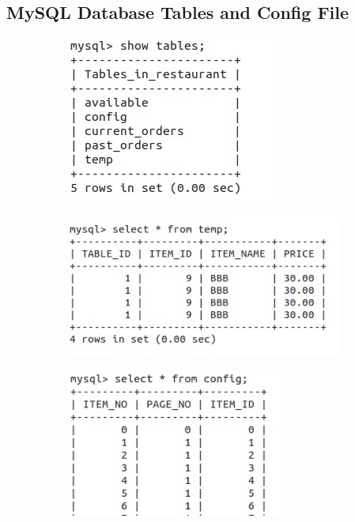 \documentclass[12pt,a4paper]{article}
\begin{document}
\subsection{MySQL Database Tables and Config File}
\begin{figure}[h]
	\centering
	\begin{subfigure}{.5\textwidth}
		\centering
		\includegraphics[width=.8\textwidth]{all_tables}
	\end{subfigure}%
	\begin{subfigure}{.5\textwidth}
		\centering
		\includegraphics[width=1\textwidth]{temp_table}
	\end{subfigure}
	\begin{subfigure}{.5\textwidth}
		\centering
		\includegraphics[width=0.8\textwidth]{config_table}

\end{subfigure}
\end{figure}
\end{document}
